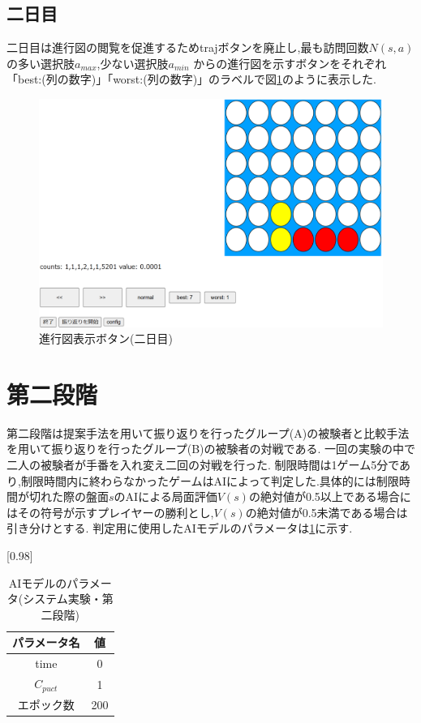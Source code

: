 \subsection{二日目}
二日目は進行図の閲覧を促進するためtrajボタンを廃止し,最も訪問回数$N(s,a)$の多い選択肢$a_{max}$,少ない選択肢$a_{min}$
からの進行図を示すボタンをそれぞれ「best:(列の数字)」「worst:(列の数字)」のラベルで図\ref{fig:best-worst}のように表示した.
\begin{figure}[t]
	\centering
	\includegraphics[width=\linewidth]{./figure/best-worst.png}
	\caption{進行図表示ボタン(二日目)}
	\label{fig:best-worst}
\end{figure}
\section{第二段階}
第二段階は提案手法を用いて振り返りを行ったグループ(A)の被験者と比較手法を用いて振り返りを行ったグループ(B)の被験者の対戦である.
一回の実験の中で二人の被験者が手番を入れ変え二回の対戦を行った.
制限時間は1ゲーム5分であり,制限時間内に終わらなかったゲームはAIによって判定した.具体的には制限時間が切れた際の盤面$s$のAIによる局面評価$V(s)$の絶対値が0.5以上である場合に
はその符号が示すプレイヤーの勝利とし,$V(s)$の絶対値が0.5未満である場合は引き分けとする.
判定用に使用したAIモデルのパラメータは\ref{table:param-judge}に示す.
\begin{table}[H]
	\caption{AIモデルのパラメータ(システム実験・第二段階)}
    \label{table:param-judge}
	\centering
	\scalebox{0.98}[0.98]{
		\begin{tabular}{c|c}
			パラメータ名 & 値 \\ \hline
			time    & 0\\ 
			$C_{puct}$    & 1 \\
            エポック数 & 200 \\
		\end{tabular}
	}
	
\end{table}


